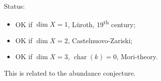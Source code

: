 \documentclass[12pt]{article}
\DeclareMathOperator{\chara}{char}
\theoremstyle{definition}
\theoremstyle{remark}
\newtheorem*{comment}{Comment}
\begin{document}
Status:
\begin{itemize}[label=$-$]
\item OK if $\dim X=1$, L\"{u}roth, 19\textsuperscript{th} century;
\item OK if $\dim X=2$, Castelnuovo-Zariski;
\item OK if $\dim X=3$, $\chara(k)=0$, Mori-theory.
\end{itemize}

This is related to the abundance conjecture.

\begin{comment}
The modules that are isomorphic to their bidual are called reflexive. For instance, a free module of finite rank is reflexive. In non-reflexive modules, when the dual is taken, some information is lost, since when taking the dual again, the original module is not retreived. There is always a canonical homomorphism to the bidual, but it isn't always an isomorphism.
\end{comment}
\end{document}
